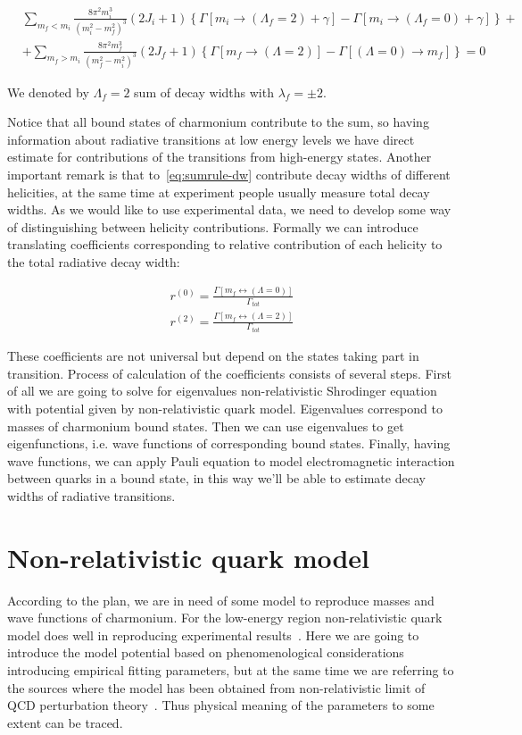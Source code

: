 \begin{align} \label{eq:sumrule-dw}
    &\sum_{m_f < m_i} \frac{8 \pi^2 m_i^3}{(m_i^2 - m_f^2)^3} (2J_i+1) \left\{\Gamma\left[m_i \rightarrow (\Lambda_f = 2) + \gamma\right] - \Gamma\left[m_i \rightarrow (\Lambda_f = 0) + \gamma\right] \right\} + \nonumber \\
    &+ \sum_{m_f > m_i} \frac{8 \pi^2 m_f^3}{(m_f^2 - m_i^2)^3} (2J_f+1) \left\{\Gamma\left[m_f \rightarrow (\Lambda = 2)\right] - \Gamma\left[(\Lambda = 0) \rightarrow m_f\right] \right\} = 0
\end{align}

We denoted by $\Lambda_f = 2$ sum of decay widths with $\lambda_f = \pm2$.

Notice that all bound states of charmonium contribute to the sum, so having information about radiative transitions at low energy levels we have direct estimate for contributions of the transitions from high-energy states. Another important remark is that to~\ref{eq:sumrule-dw} contribute decay widths of different helicities, at the same time at experiment people usually measure total decay widths. As we would like to use experimental data, we need to develop some way of distinguishing between helicity contributions. Formally we can introduce translating coefficients corresponding to relative contribution of each helicity to the total radiative decay width:

\begin{align}
    r^{(0)} = \frac{\Gamma\left[m_f \leftrightarrow (\Lambda=0)\right]}{\Gamma_{tot}} \\
    r^{(2)} = \frac{\Gamma\left[m_f \leftrightarrow (\Lambda=2)\right]}{\Gamma_{tot}}
\end{align}

These coefficients are not universal but depend on the states taking part in transition. Process of calculation of the coefficients consists of several steps. First of all we are going to solve for eigenvalues non-relativistic Shrodinger equation with potential given by non-relativistic quark model. Eigenvalues correspond to masses of charmonium bound states. Then we can use eigenvalues to get eigenfunctions, i.e. wave functions of corresponding bound states. Finally, having wave functions, we can apply Pauli equation to model electromagnetic interaction between quarks in a bound state, in this way we'll be able to estimate decay widths of radiative transitions.

\section{Non-relativistic quark model}
According to the plan, we are in need of some model to reproduce masses and wave functions of charmonium. For the low-energy region non-relativistic quark model does well in reproducing experimental results~\cite{deng-charm, deng-bot}. Here we are going to introduce the model potential based on phenomenological considerations introducing empirical fitting parameters, but at the same time we are referring to the sources where the model has been obtained from non-relativistic limit of QCD perturbation theory~\cite{nrqm-perturb}. Thus physical meaning of the parameters to some extent can be traced.

